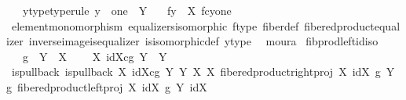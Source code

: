 \begin{isabellebody}
\ \ \ y{\isacharunderscore}{\kern0pt}type{\isacharbrackleft}{\kern0pt}type{\isacharunderscore}{\kern0pt}rule{\isacharbrackright}{\kern0pt}{\isacharcolon}{\kern0pt}\ {\isachardoublequoteopen}y\ {\isacharcolon}{\kern0pt}\ one\ {\isasymrightarrow}\ Y{\isachardoublequoteclose}\isanewline
\ \ \ {\isachardoublequoteopen}f\isactrlsup {\isacharminus}{\kern0pt}y{\isacharbraceright}{\kern0pt}\ {\isasymcong}\ X\ \isactrlbsub f\isactrlesub {\isasymtimes}\isactrlsub c\isactrlbsub y\isactrlesub one{\isachardoublequoteclose}\isanewline
%
\isadelimproof
\ \ %
\endisadelimproof
%
\isatagproof
{}\isamarkupfalse%
\ element{\isacharunderscore}{\kern0pt}monomorphism\ equalizers{\isacharunderscore}{\kern0pt}isomorphic\ f{\isacharunderscore}{\kern0pt}type\ fiber{\isacharunderscore}{\kern0pt}def\ fibered{\isacharunderscore}{\kern0pt}product{\isacharunderscore}{\kern0pt}equalizer\ inverse{\isacharunderscore}{\kern0pt}image{\isacharunderscore}{\kern0pt}is{\isacharunderscore}{\kern0pt}equalizer\ is{\isacharunderscore}{\kern0pt}isomorphic{\isacharunderscore}{\kern0pt}def\ y{\isacharunderscore}{\kern0pt}type\ \isamarkupfalse%
\ moura%
\endisatagproof
{\isafoldproof}%
%
\isadelimproof
\isanewline
%
\endisadelimproof
\isanewline
{}\isamarkupfalse%
\ fib{\isacharunderscore}{\kern0pt}prod{\isacharunderscore}{\kern0pt}left{\isacharunderscore}{\kern0pt}id{\isacharunderscore}{\kern0pt}iso{\isacharcolon}{\kern0pt}\isanewline
\ \ \ {\isachardoublequoteopen}g\ {\isacharcolon}{\kern0pt}\ Y\ {\isasymrightarrow}\ X{\isachardoublequoteclose}\isanewline
\ \ \ \ {\isachardoublequoteopen}{\isacharparenleft}{\kern0pt}X\ \isactrlbsub id{\isacharparenleft}{\kern0pt}X{\isacharparenright}{\kern0pt}\isactrlesub {\isasymtimes}\isactrlsub c\isactrlbsub g\isactrlesub \ Y{\isacharparenright}{\kern0pt}\ {\isasymcong}\ Y{\isachardoublequoteclose}\isanewline
%
\isadelimproof
%
\endisadelimproof
%
\isatagproof
{}\isamarkupfalse%
\ {\isacharminus}{\kern0pt}\ \isanewline
\ \ \isamarkupfalse%
\ is{\isacharunderscore}{\kern0pt}pullback{\isacharcolon}{\kern0pt}\ {\isachardoublequoteopen}is{\isacharunderscore}{\kern0pt}pullback\ {\isacharparenleft}{\kern0pt}X\ \isactrlbsub id{\isacharparenleft}{\kern0pt}X{\isacharparenright}{\kern0pt}\isactrlesub {\isasymtimes}\isactrlsub c\isactrlbsub g\isactrlesub \ Y{\isacharparenright}{\kern0pt}\ Y\ X\ X\ {\isacharparenleft}{\kern0pt}fibered{\isacharunderscore}{\kern0pt}product{\isacharunderscore}{\kern0pt}right{\isacharunderscore}{\kern0pt}proj\ X\ {\isacharparenleft}{\kern0pt}id{\isacharparenleft}{\kern0pt}X{\isacharparenright}{\kern0pt}{\isacharparenright}{\kern0pt}\ g\ Y{\isacharparenright}{\kern0pt}\ g\ {\isacharparenleft}{\kern0pt}fibered{\isacharunderscore}{\kern0pt}product{\isacharunderscore}{\kern0pt}left{\isacharunderscore}{\kern0pt}proj\ X\ {\isacharparenleft}{\kern0pt}id{\isacharparenleft}{\kern0pt}X{\isacharparenright}{\kern0pt}{\isacharparenright}{\kern0pt}\ g\ Y{\isacharparenright}{\kern0pt}\ {\isacharparenleft}{\kern0pt}id{\isacharparenleft}{\kern0pt}X{\isacharparenright}{\kern0pt}{\isacharparenright}{\kern0pt}{\isachardoublequoteclose}\isanewline

\end{isabellebody}
